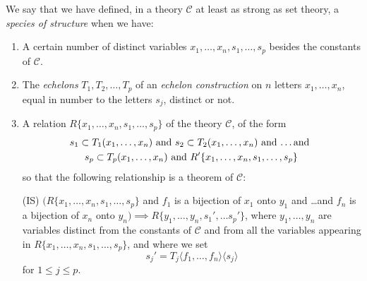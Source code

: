 \documentclass{article}
\newcommand{\C}{\mathcal{C}}
\begin{document}
We say that we have defined, in a theory
$\C$ at least as strong as set theory, a \emph{species of structure}
when we have:
\begin{enumerate}
\item A certain number of distinct variables $x_1, \dots, x_n, s_1,
  \dots, s_p$ besides the constants of $\C$.
\item The \emph{echelons} $T_1, T_2, \dots, T_p$ of an \emph{echelon
    construction} on $n$ letters $x_1, \dots, x_n$, equal in number to
  the letters $s_j$, distinct or not.
\item A relation $R\{x_1, \dots, x_n, s_1, \dots, s_p\}$ of the theory
  $\C$, of the form
  \begin{multline*}
    s_1 \subset T_1(x_1, \dots, x_n) \text{ and } s_2 \subset T_2(x_1,
    \dots, x_n) \text{ and \dots and } \\
    s_p \subset T_p(x_1, \dots, x_n) \text{ and } R'\{x_1, \dots, x_n,
    s_1, \dots, s_p\}
  \end{multline*}
  so that the following relationship is a theorem of $\C$:

(IS) $(R\{x_1, \dots, x_n, s_1, \dots, s_p\}$ and $f_1$ is a
bijection of $x_1$ onto $y_1$ and \dots and $f_n$ is a bijection of
$x_n$ onto $y_n) \implies R\{y_1, \dots, y_n, s_1', \dots s_p'\}$, where
$y_1, \dots, y_n$ are variables distinct from the constants of $\C$
and from all the variables appearing in $R\{x_1, \dots, x_n, s_1,
\dots, s_p\}$, and where we set \[ s_j' = T_j\langle f_1, \dots,
f_n\rangle \langle s_j \rangle \] for $1 \leq j \leq p$.
\end{enumerate}
\end{document}
